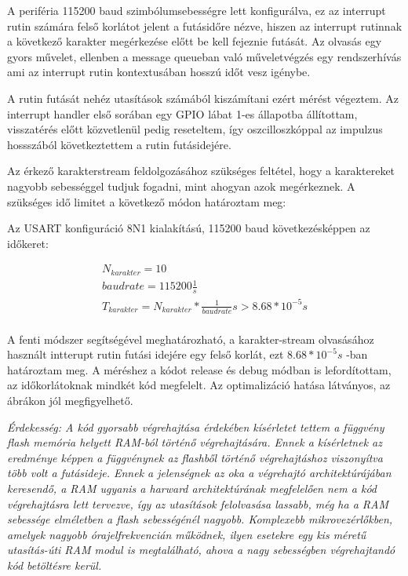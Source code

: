 A periféria 115200 baud szimbólumsebességre lett konfigurálva, ez az interrupt
rutin számára felső korlátot jelent a futásidőre nézve, hiszen az interrupt
rutinnak a következő karakter megérkezése előtt be kell fejeznie futását. Az
olvasás egy gyors művelet, ellenben a message queueban való műveletvégzés egy
rendszerhívás ami az interrupt rutin kontextusában hosszú időt vesz igénybe.

A rutin futását nehéz utasítások számából kiszámítani ezért mérést végeztem. Az
interrupt handler első sorában egy GPIO lábat 1-es állapotba állítottam,
visszatérés előtt közvetlenül pedig reseteltem, így oszcilloszkóppal az impulzus
hossszából következtettem a rutin futásidejére.


Az érkező karakterstream feldolgozásához szükséges feltétel, hogy a karaktereket
nagyobb sebességgel tudjuk fogadni, mint ahogyan azok megérkeznek. A szükséges
idő limitet a következő módon határoztam meg:

\medskip

Az USART konfiguráció 8N1 kialakítású, 115200 baud következésképpen az időkeret:

\begin{eqnarray*}
N_{karakter} = 10 \\
baudrate = 115200 \frac{1}{s} \\
T_{karakter} = N_{karakter} * \frac{1}{baudrate} s > 8.68 * 10^{-5} s \\
\end{eqnarray*}

A fenti módszer segítségével meghatározható, a karakter-stream olvasásához
használt intterupt rutin futási idejére egy felső korlát, ezt $8.68 * 10^{-5}s$
-ban határoztam meg. A méréshez a kódot release és debug módban is lefordítottam,
az időkorlátoknak mindkét kód megfelelt. Az optimalizáció hatása látványos, az
ábrákon jól megfigyelhető.

\medskip
\textsl{
Érdekesség: A kód gyorsabb végrehajtása érdekében kísérletet tettem a függvény
flash memória helyett RAM-ból történő végrehajtására. Ennek a kísérletnek az
eredménye képpen a függvénynek az flashből történő végrehajtáshoz viszonyítva
több volt a futásideje. Ennek a jelenségnek az oka a végrehajtó architektúrájában
keresendő, a RAM ugyanis a harward architektúrának megfelelően nem a
kód végrehajtásra lett tervezve, így az utasítások felolvasása lassabb, még ha a
RAM sebessége elméletben a flash sebességénél nagyobb. Komplexebb
mikrovezérlőkben, amelyek nagyobb órajelfrekvencián működnek, ilyen esetekre egy
kis méretű utasítás-úti RAM modul is megtalálható, ahova a nagy sebességben
végrehajtandó kód betöltésre kerül.
}

